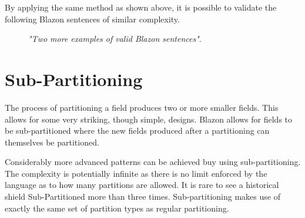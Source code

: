By applying the same method as shown above, it is possible to validate the following Blazon sentences of similar complexity. 

\begin{figure}[H]
\hfill
{}
\hfill

\caption{\emph{"Two more examples of valid Blazon sentences"}.}
\end{figure}



\section{Sub-Partitioning}

The process of partitioning a field produces two or more smaller fields.  This allows for some very striking, though simple, designs.  Blazon allows for fields to be sub-partitioned where the new fields produced after a partitioning can themselves be partitioned. 

Considerably more advanced patterns can be achieved buy using sub-partitioning.  The complexity is potentially infinite as there is no limit enforced by the language as to how many partitions are allowed.  It is rare to see a historical shield Sub-Partitioned more than three times.  Sub-partitioning makes use of exactly the same set of partition types as regular partitioning.  

